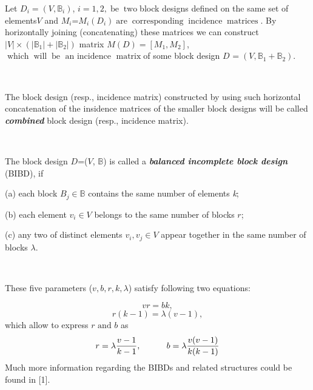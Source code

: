\documentclass{article}
\newcommand{\infixand}{\text{ and }}
\newcommand{\tmem}[1]{{\em #1\/}}
\newcommand{\tmop}[1]{\ensuremath{\operatorname{#1}}}
\newcommand{\tmstrong}[1]{\textbf{#1}}
\newenvironment{tmparmod}[3]{\begin{list}{}{\setlength{\topsep}{0pt}\setlength{\leftmargin}{#1}\setlength{\rightmargin}{#2}\setlength{\parindent}{#3}\setlength{\listparindent}{\parindent}\setlength{\itemindent}{\parindent}\setlength{\parsep}{\parskip}} \item[]}{\end{list}}
\begin{document}
\begin{tmparmod}{0pt}{0pt}{0tab}%
  Let $D_i = \left( V, \mathbb{B}_i \right)$, $i = 1, 2, \tmop{be}
  \tmop{two}$block designs defined on the same set of elements$V$ and
  $M_i$=$M_i (D_i) \tmop{are} \tmop{corresponding} \tmop{incidence}
  \tmop{matrices}$. By horizontally joining (concatenating) these matrices we
  can construct $| V | \times \left( \left| \mathbb{B}_1 \right| + \left|
  \mathbb{B}_2 \right| \right)$ matrix $M (D) = [M_1, M_2]$, $\tmop{which}
  \tmop{will} \tmop{be} \text{ an incidence } \tmop{matrix} $of some block
  design $D_{} = \left( V, \mathbb{B}_1 +\mathbb{B}_2 \right)$.
  
  \
  
  The block design (resp., incidence matrix) constructed by using such
  horizontal concatenation of the insidence matrices of the smaller block
  designs will be called
  {\tmem{{\tmem{{\tmem{{\tmstrong{combined{\tmem{}}}}}}{\tmstrong{}}}}}} block
  design (resp., incidence matrix).
\end{tmparmod}

\

\begin{tmparmod}{0pt}{0pt}{0tab}%
  The block design $D$=($V$, $\mathbb{B}$) is called a{\tmem{
  {\tmstrong{}}}}{\tmstrong{{\tmem{{\tmstrong{}}balanced incomplete block
  design}}}} (BIBD), if
\end{tmparmod}

{\nopagebreak}(a) each block $B_j \in \mathbb{B}$ contains the same number of
elements {\tmem{k}};

(b) each element $v_i \in V$ belongs to the same number of blocks $r$;

(c) any two of distinct elements $v_i, v_j \in V$ appear together in the same
number of blocks $\lambda$.

\

\begin{tmparmod}{0pt}{0pt}{0tab}%
  These five parameters ($v, b, r, k, \lambda$) satisfy following two
  equations:
\end{tmparmod}
\[ v r = {} b k, \]
\[ r (k - 1) = \lambda (v - 1), \]
which allow to express $r \infixand b$ as
\begin{equation}
  r = \lambda \frac{v - 1}{k - 1}, \text{{\hspace{3em}}} b = \lambda \frac{v
  (v - 1)}{k (k - 1)}
\end{equation}
Much more information regarding the BIBDs and related structures could be
found in [1].
\end{document}
